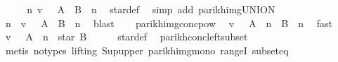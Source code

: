\begin{isabellebody}
\ \ \isamarkupfalse%
\ \isamarkupfalse%
\ {\isachardoublequoteopen}{\isasymexists}n{\isachardot}{\kern0pt}\ v\ {\isasymin}\ {\isasymPsi}\ {\isacharparenleft}{\kern0pt}{\isacharparenleft}{\kern0pt}A\ {\isacharat}{\kern0pt}{\isacharat}{\kern0pt}\ B{\isacharparenright}{\kern0pt}\ {\isacharcircum}{\kern0pt}{\isacharcircum}{\kern0pt}\ n{\isacharparenright}{\kern0pt}{\isachardoublequoteclose}\ \isamarkupfalse%
\ star{\isacharunderscore}{\kern0pt}def\ \isamarkupfalse%
\ {\isacharparenleft}{\kern0pt}simp\ add{\isacharcolon}{\kern0pt}\ parikh{\isacharunderscore}{\kern0pt}img{\isacharunderscore}{\kern0pt}UNION{\isacharparenright}{\kern0pt}\isanewline
\ \ \isamarkupfalse%
\ \isamarkupfalse%
\ n\ \ {\isachardoublequoteopen}v\ {\isasymin}\ {\isasymPsi}\ {\isacharparenleft}{\kern0pt}{\isacharparenleft}{\kern0pt}A\ {\isacharat}{\kern0pt}{\isacharat}{\kern0pt}\ B{\isacharparenright}{\kern0pt}\ {\isacharcircum}{\kern0pt}{\isacharcircum}{\kern0pt}\ n{\isacharparenright}{\kern0pt}{\isachardoublequoteclose}\ \isamarkupfalse%
\ blast\isanewline
\ \ \isamarkupfalse%
\ parikh{\isacharunderscore}{\kern0pt}img{\isacharunderscore}{\kern0pt}conc{\isacharunderscore}{\kern0pt}pow\ \isamarkupfalse%
\ {\isachardoublequoteopen}v\ {\isasymin}\ {\isasymPsi}\ {\isacharparenleft}{\kern0pt}A\ {\isacharcircum}{\kern0pt}{\isacharcircum}{\kern0pt}\ n\ {\isacharat}{\kern0pt}{\isacharat}{\kern0pt}\ B\ {\isacharcircum}{\kern0pt}{\isacharcircum}{\kern0pt}\ n{\isacharparenright}{\kern0pt}{\isachardoublequoteclose}\ \isamarkupfalse%
\ fast\isanewline
\ \ \isamarkupfalse%
\ \isamarkupfalse%
\ {\isachardoublequoteopen}v\ {\isasymin}\ {\isasymPsi}\ {\isacharparenleft}{\kern0pt}A\ {\isacharcircum}{\kern0pt}{\isacharcircum}{\kern0pt}\ n\ {\isacharat}{\kern0pt}{\isacharat}{\kern0pt}\ star\ B{\isacharparenright}{\kern0pt}{\isachardoublequoteclose}\isanewline
\ \ \ \ \isamarkupfalse%
\ star{\isacharunderscore}{\kern0pt}def\ \isamarkupfalse%
\ parikh{\isacharunderscore}{\kern0pt}conc{\isacharunderscore}{\kern0pt}left{\isacharunderscore}{\kern0pt}subset\isanewline
\ \ \ \ \isamarkupfalse%
\ {\isacharparenleft}{\kern0pt}metis\ {\isacharparenleft}{\kern0pt}no{\isacharunderscore}{\kern0pt}types{\isacharcomma}{\kern0pt}\ lifting{\isacharparenright}{\kern0pt}\ Sup{\isacharunderscore}{\kern0pt}upper\ parikh{\isacharunderscore}{\kern0pt}img{\isacharunderscore}{\kern0pt}mono\ rangeI\ subset{\isacharunderscore}{\kern0pt}eq{\isacharparenright}{\kern0pt}\isanewline

\end{isabellebody}
